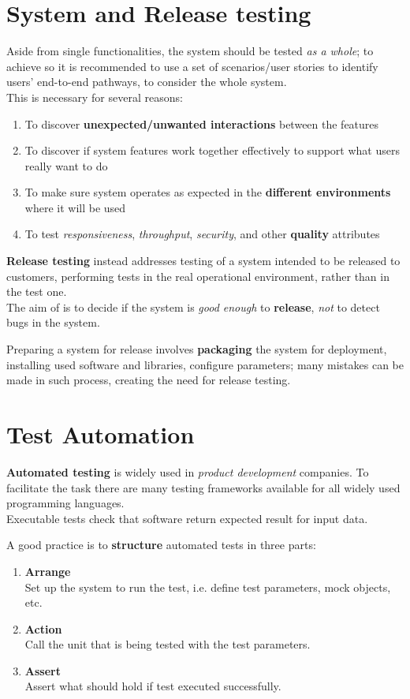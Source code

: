 \section{System and Release testing}
Aside from single functionalities, the system should be tested \textit{as a whole};
to achieve so it is recommended to use a set of scenarios/user stories to identify users’ end-to-end pathways,
to consider the whole system.\\
This is necessary for several reasons:
\begin{enumerate}
   \item To discover \textbf{unexpected/unwanted interactions} between the features
   \item To discover if system features work together effectively to support what
   users really want to do
   \item To make sure system operates as expected in the \textbf{different environments}
   where it will be used
   \item To test \textit{responsiveness}, \textit{throughput}, \textit{security}, and other \textbf{quality} attributes
\end{enumerate}

\textbf{Release testing} instead addresses testing of a system intended to be released to customers,
performing tests in the real operational environment, rather than
in the test one.\\
The aim of is to decide if the system is \textit{good enough} to \textbf{release}, \textit{not} to detect bugs in the system.

Preparing a system for release involves \textbf{packaging} the system for
deployment, installing used software and libraries, configure parameters;
many  mistakes can be made in such process, creating the need for release testing.

\section{Test Automation}
\textbf{Automated testing} is widely used in \textit{product development} companies.
To facilitate the task there are many testing frameworks available for all widely used programming languages.\\
Executable tests check that software return expected result for input data.

A good practice is to \textbf{structure} automated tests in three parts:
\begin{enumerate}
   \item \textbf{Arrange}\\
   Set up the system to run the test, i.e. define test parameters, mock objects, etc.
   \item \textbf{Action}\\
   Call the unit that is being tested with the test parameters.
   \item \textbf{Assert}\\
   Assert what should hold if test executed successfully.
\end{enumerate}

